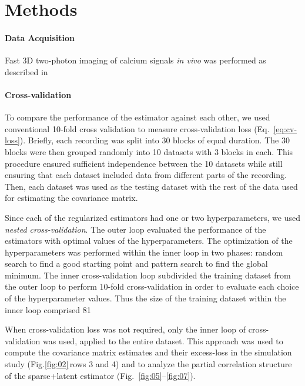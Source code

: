 \documentclass[10pt]{article}
\newcommand{\figref}[2]{Fig.\;\ref{fig:#1}\,#2}
\begin{document}
\section*{Methods}
\paragraph{Data Acquisition}
Fast 3D two-photon imaging of calcium signals \emph{in vivo} was performed as described in \cite{Cotton:2013}

\paragraph{Cross-validation}
To compare the performance of the estimator against each other, we used conventional 10-fold cross validation to measure cross-validation loss (Eq.~\ref{eq:cv-loss}). Briefly, each recording was split into 30 blocks of equal duration.  The 30 blocks were then grouped randomly into 10 datasets with 3 blocks in each.  This procedure ensured sufficient independence between the 10 datasets while still ensuring that each dataset included data from different parts of the recording.   Then, each dataset was used as the testing dataset with the rest of the data used for estimating the covariance matrix.  

Since each of the regularized estimators had one or two hyperparameters, we used \emph{nested cross-validation}.  The outer loop evaluated the performance of the estimators with optimal values of the hyperparameters.  The optimization of the hyperparameters was performed within the inner loop in two phases: random search to find a good starting point and pattern search to find the global minimum.  The inner cross-validation loop subdivided the training dataset from the outer loop to perform 10-fold cross-validation in order to evaluate each choice of the hyperparameter values.  Thus the size of the training dataset within the inner loop comprised 81%

When cross-validation loss was not required, only the inner loop of cross-validation was used, applied to the entire dataset.  This approach was used to compute the covariance matrix estimates and their excess-loss in the simulation study (\figref{02}{\;rows 3 and 4}) and to analyze the partial correlation structure of the sparse+latent estimator (Fig.~\ref{fig:05}--\ref{fig:07}).
\end{document}
